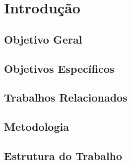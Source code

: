 \chapter{Introdução} 
\label{cap:Introducao}


    \section{Objetivo Geral}


    \section{Objetivos Específicos}



    \section{Trabalhos Relacionados}


    \section{Metodologia}
        

    \section{Estrutura do Trabalho}
       